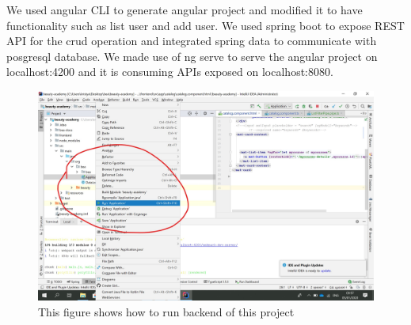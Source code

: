 \documentclass{scrartcl}
\begin{document}

 
 
 
We used angular CLI to generate angular project and modified it to have functionality such as list user and add user. We used spring boot to expose REST API for the crud operation and integrated spring data to communicate with posgresql database. We made use of ng serve to serve the angular project on localhost:4200 and it is consuming APIs exposed on localhost:8080. 


\begin{figure}[H]
\centering
\includegraphics[width=150mm]{run_backend.JPG}
\caption{This figure shows how to run backend of this project}
\label{blabla}
\end{figure}
\end{document}
